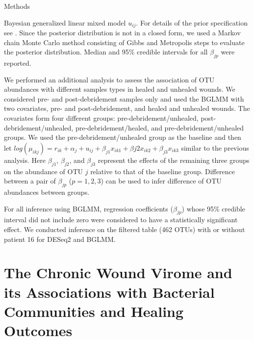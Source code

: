 \documentclass[oneside,12pt,final]{sty/ucthesis-CA2012}
\begin{document}
\begin{mainmatter}
\begin{section}{Methods}
\begin{subsection}{Bayesian generalized linear mixed model}
$u_{ij}$. For details of the prior specification see \cite{RN33}.  Since the posterior distribution is not in a closed form, we used a Markov chain Monte Carlo method consisting of Gibbs and Metropolis steps to evaluate the posterior distribution. Median and 95\% credible intervals for all $\beta_{jp}$ were reported.  

We performed an additional analysis to assess the association of OTU abundances with different samples types in healed and unhealed wounds. We considered pre- and post-debridement samples only and used the BGLMM with two covariates, pre- and post-debridement, and healed and unhealed wounds. The covariates form four different groups: pre-debridement/unhealed, post-debridement/unhealed, pre-debridement/healed, and pre-debridement/unhealed groups. We used the pre-debridement/unhealed group as the baseline and then let $log(\mu_{ikj}) = r_{ik} + \alpha_{j} + u_{ij} + \beta_{j1}x_{ik1} + \beta{j2}x_{ik2} + \beta_{j3}x_{ik3}$ similar to the previous analysis. Here $\beta_{j1}$, $\beta_{j2}$, and $\beta_{j3}$ represent the effects of the remaining three groups on the abundance of OTU $j$ relative to that of the baseline group.  Difference between a pair of $\beta_{jp}$ ($p = 1,2,3$) can be used to infer difference of OTU abundances between groups.

For all inference using BGLMM, regression coefficients ($\beta_{jp}$) whose 95\% credible interval did not include zero were considered to have a statistically significant effect. We conducted inference on the filtered table (462 OTUs) with or without patient 16 for DESeq2 and BGLMM.
\end{subsection}

\end{section}


\chapter{The Chronic Wound Virome and its Associations with Bacterial Communities and Healing Outcomes}\newpage
\label{Chapter 4}


\end{mainmatter}
\end{document}

